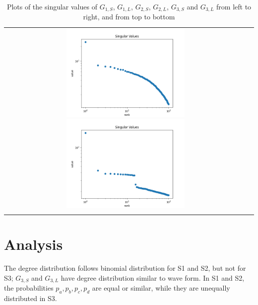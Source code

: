 \documentclass[12pt, letterpaper, twoside]{article}
\begin{document}
\begin{center}
\begin{longtable}{ c c }
        \includegraphics[width=0.5\textwidth]{3S_svd.png} \includegraphics[width=0.5\textwidth]{3L_svd.png} \\
    \caption{Plots of the singular values of $G_{1,S}$, $G_{1,L}$, $G_{2,S}$, $G_{2,L}$, $G_{3,S}$ and $G_{3,L}$ from left to right, and from top to bottom}
    \end{longtable}
    
    \end{center}

\section{Analysis}

The degree distribution follows binomial distribution for S1 and S2, but not for S3; $G_{3,S}$ and $G_{3,L}$ have degree distribution similar to wave form. %
In S1 and S2, the probabilities $p_a,p_b,p_c,p_d$ are equal or similar, while they are unequally distributed in S3.
\end{document}
